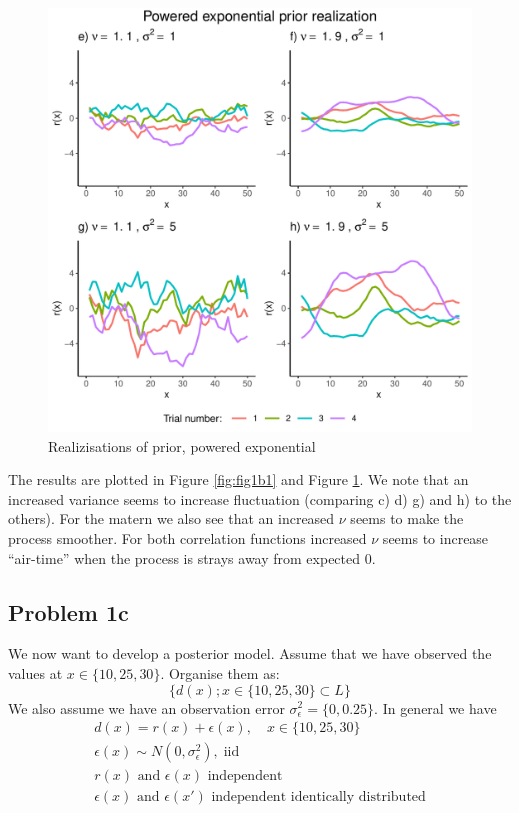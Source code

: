 \documentclass[]{article}
\DeclareMathOperator{\iid}{\text{iid}}
\begin{document}
\begin{figure}

{\centering \includegraphics{Exercise-1_files/figure-latex/fig1b2-1} 

}

\caption{\label{fig:fig1b2} Realizisations of prior, powered exponential}\label{fig:fig1b2}
\end{figure}

The results are plotted in Figure \ref{fig:fig1b1} and Figure
\ref{fig:fig1b2}. We note that an increased variance seems to increase
fluctuation (comparing c) d) g) and h) to the others). For the matern we
also see that an increased \(\nu\) seems to make the process smoother.
For both correlation functions increased \(\nu\) seems to increase
``air-time'' when the process is strays away from expected 0.

\newpage

\hypertarget{problem-1c}{%
\subsection{Problem 1c}\label{problem-1c}}

We now want to develop a posterior model. Assume that we have observed
the values at \(x \in \lbrace 10, 25, 30 \rbrace\). Organise them as:
\begin{equation}
    \lbrace d(x); x \in \lbrace 10, 25, 30 \rbrace \subset L  \rbrace 
\end{equation} We also assume we have an observation error
\(\sigma^2_\epsilon = \lbrace 0, 0.25 \rbrace\). In general we have
\begin{gather}
    d(x) = r(x) + \epsilon(x), \quad x \in \lbrace 10, 25, 30 \rbrace \\
   \epsilon(x) \sim N(0, \sigma_\epsilon^2), \iid \\
   r(x) \text{ and } \epsilon(x) \text{ independent} \\
   \epsilon(x) \text{ and } \epsilon(x') \text{ independent identically distributed} 
\end{gather}
\end{document}
